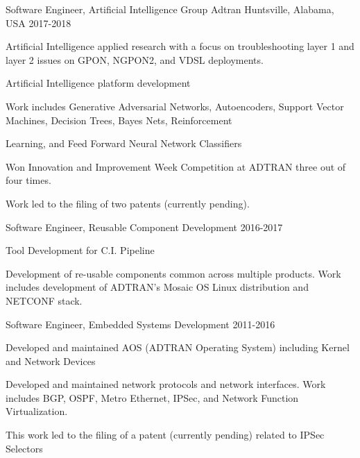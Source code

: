 

\begin{cventries}

  \cventry
    {Software Engineer, Artificial Intelligence Group} %
    {Adtran} %
    {Huntsville, Alabama, USA} %
    {2017-2018} %
    {
      \begin{cvitems} %
\item Artificial Intelligence applied research with a focus on troubleshooting layer 1 and layer 2 issues on GPON, NGPON2, and VDSL deployments.
\item Artificial Intelligence platform development
\item Work includes Generative Adversarial Networks, Autoencoders, Support Vector Machines, Decision Trees, Bayes Nets, Reinforcement
\item Learning, and Feed Forward Neural Network Classifiers
\item  Won Innovation and Improvement Week Competition at ADTRAN three out of four times.
\item  Work led to the filing of two patents (currently pending).
      \end{cvitems}
    }

  \cventry
    {Software Engineer, Reusable Component Development} %
    {} %
    {} %
    {2016-2017} %
    {
      \begin{cvitems} %
\item  Tool Development for C.I. Pipeline
\item  Development of re-usable components common across multiple products. Work includes development of ADTRAN’s Mosaic OS Linux distribution and NETCONF stack.
      \end{cvitems}
    }

  \cventry
    {Software Engineer, Embedded Systems Development} %
    {} %
    {} %
    {2011-2016} %
    {
      \begin{cvitems} %
\item Developed and maintained AOS (ADTRAN Operating System) including Kernel and Network Devices
\item Developed and maintained network protocols and network interfaces. Work includes BGP, OSPF, Metro Ethernet, IPSec, and Network Function Virtualization.
\item This work led to the filing of a patent (currently pending) related to IPSec Selectors
      \end{cvitems}
    }


\end{cventries}
